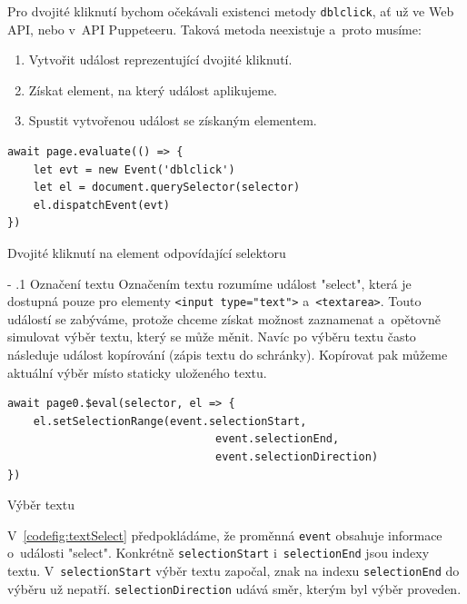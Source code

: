 \documentclass[12pt, a4paper, twoside]{article}
\makeatletter
\newcommand{\codefigureSpacing}{1.2}
\renewcommand\paragraph{%
	\@startsection{subparagraph}{5}{0mm}%
	{-\baselineskip}%
	{.1\baselineskip}%
	{\normalfont\normalsize\bfseries}}
\makeatother
\begin{document}
	Pro dvojité kliknutí bychom očekávali existenci metody \texttt{dblclick}, ať už ve Web API, nebo v~API Puppeteeru. Taková metoda neexistuje a~proto musíme:
	\begin{enumerate}
		\item Vytvořit událost reprezentující dvojité kliknutí.
		\item Získat element, na který událost aplikujeme.
		\item Spustit vytvořenou událost se získaným elementem.
	\end{enumerate}
	\begin{codefigure}[H]
		\renewcommand\baselinestretch{\codefigureSpacing}
	\begin{lstlisting}[style=MyJavaScript]
await page.evaluate(() => { 
	let evt = new Event('dblclick')
	let el = document.querySelector(selector)
	el.dispatchEvent(evt) 
})
	\end{lstlisting}
	\caption{Dvojité kliknutí na element odpovídající selektoru}
\end{codefigure}	
	\newpage
	\paragraph{Označení textu}
	Označením textu rozumíme událost "select", která je dostupná pouze pro elementy \foreignlanguage{english}{\texttt{<input type="text">}} a~\texttt{<textarea>}. Touto událostí se zabýváme, protože chceme získat možnost zaznamenat a~opětovně simulovat výběr textu, který se může měnit. Navíc po výběru textu často následuje událost kopírování (zápis textu do schránky). Kopírovat pak můžeme aktuální výběr místo staticky uloženého textu.
	\begin{codefigure}[H]
		\renewcommand\baselinestretch{\codefigureSpacing}
	\begin{lstlisting}[style=MyJavaScript]
await page0.$eval(selector, el => { 
	el.setSelectionRange(event.selectionStart, 
	                            event.selectionEnd, 
	                            event.selectionDirection) 
})
	\end{lstlisting}
	\caption{Výběr textu}
	\label{codefig:textSelect}
	\end{codefigure}
V~\cref{codefig:textSelect} předpokládáme, že proměnná \texttt{event} obsahuje informace o~události "select". Konkrétně \texttt{selectionStart} i~\texttt{selectionEnd} jsou indexy textu. V~\texttt{selectionStart} výběr textu započal, znak na indexu \texttt{selectionEnd} do výběru už nepatří. \texttt{selectionDirection} udává směr, kterým byl výběr proveden.
\end{document}
